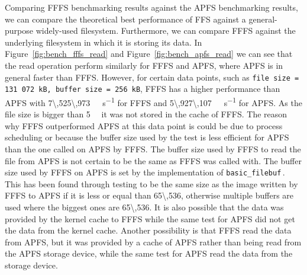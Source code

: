 Comparing \gls{FFFS} benchmarking results against the \gls{APFS} benchmarking results, we can compare the theoretical best performance of \gls{FFS} against a \mbox{general-purpose} \mbox{widely-used} filesystem. Furthermore, we can compare \gls{FFFS} against the underlying filesystem in which it is storing its data. In Figure~\ref{fig:bench_fffs_read} and Figure~\ref{fig:bench_apfs_read} we can see that the read operation perform similarly for \gls{FFFS} and \gls{APFS}, where \gls{APFS} is in general faster than \gls{FFFS}. However, for certain data points, such as \texttt{file size = 131\,072\,kB, buffer size = 256\,kB}, \gls{FFFS} has a higher performance than \gls{APFS} with \SI[per-mode = symbol]{7\,525\,973}{\kilo\byte\per\second} for \gls{FFFS} and \SI[per-mode = symbol]{5\,927\,107}{\kilo\byte\per\second} for \gls{APFS}. As the file size is bigger than \SI{5}{\mega\byte} it was not stored in the cache of \gls{FFFS}. The reason why \gls{FFFS} outperformed \gls{APFS} at this data point is could be due to process scheduling or because the buffer size used by the test is less efficient for \gls{APFS} than the one called on \gls{APFS} by \gls{FFFS}. The buffer size used by \gls{FFFS} to read the file from \gls{APFS} is not certain to be the same as \gls{FFFS} was called with. The buffer size used by \gls{FFFS} on \gls{APFS} is set by the implementation of \texttt{basic\_filebuf}\,\cite{cppreference.comStdBasicFilebuf2020}. This has been found through testing to be the same size as the image written by \gls{FFFS} to \gls{APFS} if it is less or equal than \SI[per-mode = symbol]{65\,536}{\byte}, otherwise multiple buffers are used where the biggest ones are \SI[per-mode = symbol]{65\,536}{\byte}. It is also possible that the data was provided by the kernel cache to \gls{FFFS} while the same test for \gls{APFS} did not get the data from the kernel cache. Another possibility is that \gls{FFFS} read the data from \gls{APFS}, but it was provided by a cache of \gls{APFS} rather than being read from the \gls{APFS} storage device, while the same test for \gls{APFS} read the data from the storage device.

